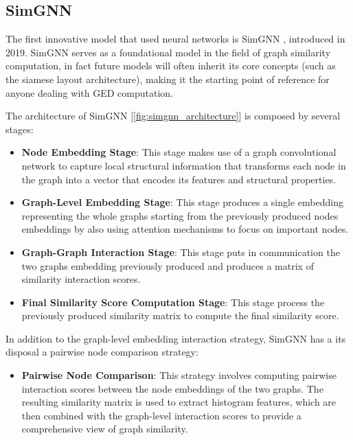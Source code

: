 \documentclass[../Thesis.tex]{subfiles}
\begin{document}
	\subsection{SimGNN}
	
	The first innovative model that used neural networks is SimGNN \cite{simgnn__a_neural_network_approach_to_fast_graph_similarity_computation}, introduced in 2019. SimGNN serves as a foundational model in the field of graph similarity computation, in fact future models will often inherit its core concepts (such as the siamese layout architecture), making it the starting point of reference for anyone dealing with GED computation. 
	
	The architecture of SimGNN [\autoref{fig:simgnn_architecture}] is composed by several stages:
	
	\begin{itemize}
		\item \textbf{Node Embedding Stage}: This stage makes use of a graph convolutional network to capture local structural information that transforms each node in the graph into a vector that encodes its features and structural properties.
		\item \textbf{Graph-Level Embedding Stage}: This stage produces a single embedding representing the whole graphs starting from the previously produced nodes embeddings by also using attention mechanisms to focus on important nodes.
		\item \textbf{Graph-Graph Interaction Stage}: This stage puts in communication the two graphs embedding previously produced and produces a matrix of similarity interaction scores.
		\item \textbf{Final Similarity Score Computation Stage}: This stage process the previously produced similarity matrix to compute the final similarity score.
	\end{itemize}
	
	In addition to the graph-level embedding interaction strategy, SimGNN has a its disposal a pairwise node comparison strategy:
	
	\begin{itemize}
		\item \textbf{Pairwise Node Comparison}: This strategy involves computing pairwise interaction scores between the node embeddings of the two graphs. The resulting similarity matrix is used to extract histogram features, which are then combined with the graph-level interaction scores to provide a comprehensive view of graph similarity.
	\end{itemize}
	
\end{document}
